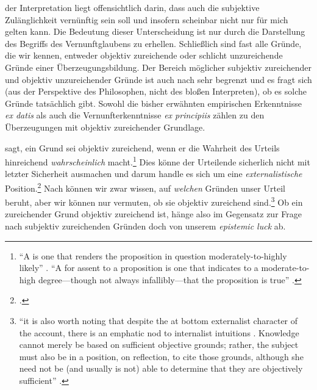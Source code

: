 der Interpretation liegt offensichtlich darin, dass auch die subjektive
Zulänglichkeit vernünftig sein soll und insofern scheinbar nicht nur für mich
gelten kann. Die Bedeutung dieser Unterscheidung ist nur durch die Darstellung
des Begriffs des Vernunftglaubens zu erhellen. Schließlich sind fast alle
Gründe, die wir kennen, entweder objektiv zureichende oder schlicht
unzureichende Gründe einer Überzeugungsbildung. Der Bereich möglicher subjektiv
zureichender und objektiv unzureichender Gründe ist auch nach
 sehr begrenzt und es fragt sich (aus der Perspektive des
Philosophen, nicht des bloßen Interpreten), ob es solche Gründe tatsächlich
gibt. Sowohl die bisher erwähnten empirischen Erkenntnisse \emph{ex datis} als
auch die Vernunfterkenntnisse \emph{ex principiis} zählen zu den
Überzeugungen mit objektiv zureichender Grundlage.

 sagt, ein Grund sei
objektiv zureichend, wenn er die Wahrheit des Urteils hinreichend
\emph{wahrscheinlich} macht.\footnote{\enquote{A  is
one that renders the proposition in question moderately-to-highly likely}
\parencite[][42]{Chignell:KantsConceptsofJustification2007}. \enquote{A
 for assent to a proposition is one that
indicates to a moderate-to-high degree---though not always infallibly---that
the proposition is true} \parencite[][326]{Chignell:BeliefinKant2007}.} Dies
könne der Urteilende sicherlich nicht mit letzter Sicherheit ausmachen und darum
handle es sich um eine \emph{externalistische}
Position.\footnote{\cite[Vgl.][49]{Chignell:KantsConceptsofJustification2007}.}
Nach  können wir zwar
wissen, auf \emph{welchen} Gründen unser Urteil beruht, aber wir können nur
vermuten, ob sie objektiv zureichend sind.\footnote{\enquote{it is also worth
noting that despite the at bottom externalist character of the account, there is
an emphatic nod to internalist intuitions {\punkt}. Knowledge cannot merely be
based on sufficient objective grounds; rather, the subject must also be in a
position, on reflection, to cite those grounds, although she need not be
(and usually is not) able to determine that they are objectively
sufficient}
\parencite[][\pno~49\,f.]{Chignell:KantsConceptsofJustification2007}.} Ob ein
zureichender Grund objektiv zureichend ist, hänge also im Gegensatz zur Frage
nach subjektiv zureichenden Gründen doch von unserem \emph{epistemic luck} ab.

